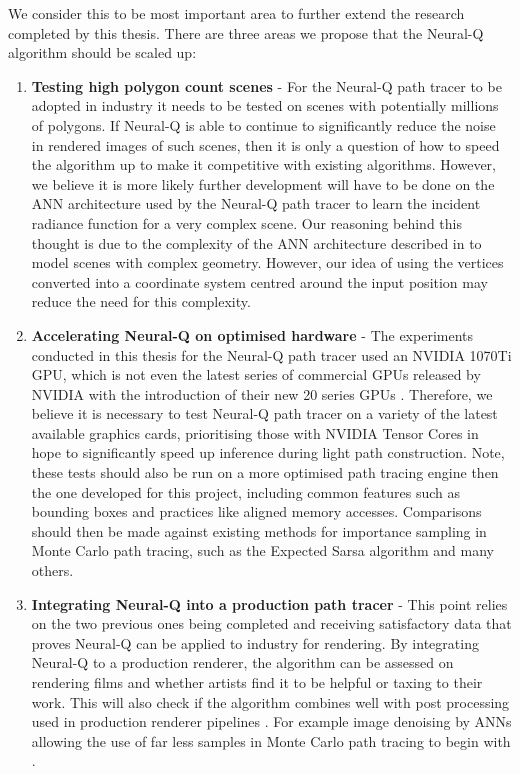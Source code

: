 \documentclass[../dissertation.tex]{subfiles}
\begin{document}
We consider this to be most important area to further extend the research completed by this thesis. There are three areas we propose that the Neural-Q algorithm should be scaled up:

\begin{enumerate}
\item \textbf{Testing high polygon count scenes} - For the Neural-Q path tracer to be adopted in industry it needs to be tested on scenes with potentially millions of polygons. If Neural-Q is able to continue to significantly reduce the noise in rendered images of such scenes, then it is only a question of how to speed the algorithm up to make it competitive with existing algorithms. However, we believe it is more likely further development will have to be done on the ANN architecture used by the Neural-Q path tracer to learn the incident radiance function for a very complex scene. Our reasoning behind this thought is due to the complexity of the ANN architecture described in \cite{muller2018neural} to model scenes with complex geometry. However, our idea of using the vertices converted into a coordinate system centred around the input position may reduce the need for this complexity.

\item \textbf{Accelerating Neural-Q on optimised hardware} - The experiments conducted in this thesis for the Neural-Q path tracer used an NVIDIA 1070Ti GPU, which is not even the latest series of commercial GPUs released by NVIDIA with the introduction of their new 20 series GPUs \cite{nvidia_turing_architecture_whitepaper_2018}. Therefore, we believe it is necessary to test Neural-Q path tracer on a variety of the latest available graphics cards, prioritising those with NVIDIA Tensor Cores \cite{tensor_cores} in hope to significantly speed up inference during light path construction. Note, these tests should also be run on a more optimised path tracing engine then the one developed for this project, including common features such as bounding boxes \cite{boulos2005notes} and practices like aligned memory accesses. Comparisons should then be made against existing methods for importance sampling in Monte Carlo path tracing, such as the Expected Sarsa algorithm and many others.

\item \textbf{Integrating Neural-Q into a production path tracer} - This point relies on the two previous ones being completed and receiving satisfactory data that proves Neural-Q can be applied to industry for rendering. By integrating Neural-Q to a production renderer, the algorithm can be assessed on rendering films and whether artists find it to be helpful or taxing to their work. This will also check if the algorithm combines well with post processing used in production renderer pipelines \cite{georgiev2018arnold, christensen2018renderman}. For example image denoising by ANNs allowing the use of far less samples in Monte Carlo path tracing to begin with \cite{bako2017kernel, chaitanya2017interactive}.
\end{enumerate}
\end{document}
